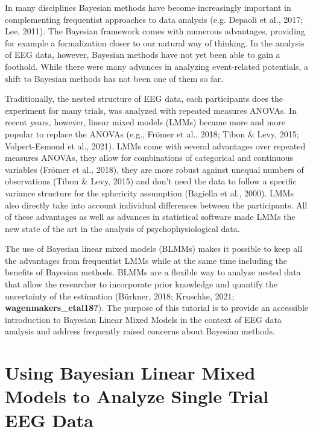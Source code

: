 \documentclass[
  doc,12pt,floatsintext]{apa7}
\begin{document}
In many disciplines Bayesian methods have become increasingly important in complementing frequentist approaches to data analysis (e.g. Depaoli et al., 2017; Lee, 2011). The Bayesian framework comes with numerous advantages, providing for example a formalization closer to our natural way of thinking. In the analysis of EEG data, however, Bayesian methods have not yet been able to gain a foothold. While there were many advances in analyzing event-related potentials, a shift to Bayesian methods has not been one of them so far.

Traditionally, the nested structure of EEG data, each participants does the experiment for many trials, was analyzed with repeated measures ANOVAs. In recent years, however, linear mixed models (LMMs) became more and more popular to replace the ANOVAs (e.g., Frömer et al., 2018; Tibon \& Levy, 2015; Volpert-Esmond et al., 2021). LMMs come with several advantages over repeated measures ANOVAs, they allow for combinations of categorical and continuous variables (Frömer et al., 2018), they are more robust against unequal numbers of observations (Tibon \& Levy, 2015) and don't need the data to follow a specific variance structure for the sphericity assumption (Bagiella et al., 2000). LMMs also directly take into account individual differences between the participants. All of these advantages as well as advances in statistical software made LMMs the new state of the art in the analysis of psychophysiological data.

The use of Bayesian linear mixed models (BLMMs) makes it possible to keep all the advantages from frequentist LMMs while at the same time including the benefits of Bayesian methods. BLMMs are a flexible way to analyze nested data that allow the researcher to incorporate prior knowledge and quantify the uncertainty of the estimation (Bürkner, 2018; Kruschke, 2021; \textbf{wagenmakers\_etal18?}). The purpose of this tutorial is to provide an accessible introduction to Bayesian Linear Mixed Models in the context of EEG data analysis and address frequently raised concerns about Bayesian methods.

\section{Using Bayesian Linear Mixed Models to Analyze Single Trial EEG Data}\label{using-bayesian-linear-mixed-models-to-analyze-single-trial-eeg-data}
\end{document}
